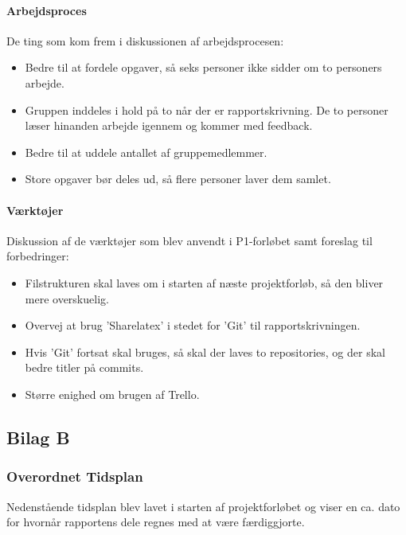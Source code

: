 \documentclass[oneside,a4paper,titlepage]{article}
\begin{document}
\paragraph{Arbejdsproces}

De ting som kom frem i diskussionen af arbejdsprocesen:

\begin{itemize}
\item Bedre til at fordele opgaver, så seks personer ikke sidder om to personers arbejde. 
\item Gruppen inddeles i hold på to når der er rapportskrivning. De to personer læser hinanden arbejde igennem og kommer med feedback.
\item Bedre til at uddele antallet af gruppemedlemmer. 
\item Store opgaver bør deles ud, så flere personer laver dem samlet.
\end{itemize}

\paragraph{Værktøjer}

Diskussion af de værktøjer som blev anvendt i P1-forløbet samt foreslag til forbedringer:

\begin{itemize}
\item Filstrukturen skal laves om i starten af næste projektforløb, så den bliver mere overskuelig.
\item Overvej at brug 'Sharelatex' i stedet for 'Git' til rapportskrivningen. 
\item Hvis 'Git' fortsat skal bruges, så skal der laves to repositories, og der skal bedre titler på commits. 
\item Større enighed om brugen af Trello.
\end{itemize}

\subsection{Bilag B}

\subsubsection*{Overordnet Tidsplan}
\label{sec:tidsplan}
Nedenstående tidsplan blev lavet i starten af projektforløbet og viser en ca. dato for hvornår rapportens dele regnes med at være færdiggjorte.
\end{document}
